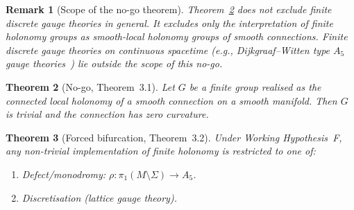 \documentclass[sn-mathphys-num,Numbered]{sn-jnl}
\theoremstyle{thmstyleone}
\newtheorem{theorem}{Theorem}[section]
\theoremstyle{thmstylethree}
\theoremstyle{thmstyletwo}
\newtheorem{remark}[theorem]{Remark}
\begin{document}
\begin{remark}[Scope of the no-go theorem]
Theorem~\ref{thm:nogo} does not exclude finite discrete gauge theories in
general.  It excludes only the interpretation of finite holonomy groups
as \emph{smooth-local} holonomy groups of smooth connections.  Finite
discrete gauge theories on continuous spacetime (e.g., Dijkgraaf--Witten
type $A_5$ gauge theories~\cite{DW1990}) lie outside the scope of this
no-go.
\end{remark}

\begin{theorem}[No-go, Theorem~3.1]
\label{thm:nogo}
Let $G$ be a finite group realised as the connected local holonomy of a
smooth connection on a smooth manifold.  Then $G$ is trivial and the
connection has zero curvature.
\end{theorem}

\begin{theorem}[Forced bifurcation, Theorem~3.2]
\label{thm:bifurcation}
Under Working Hypothesis~F, any non-trivial implementation of finite
holonomy is restricted to one of:
\begin{enumerate}
  \item[(A)] Defect/monodromy: $\rho:\pi_1(M\setminus\Sigma)\to A_5$.
  \item[(B)] Discretisation (lattice gauge theory).
\end{enumerate}
\end{theorem}
\end{document}
